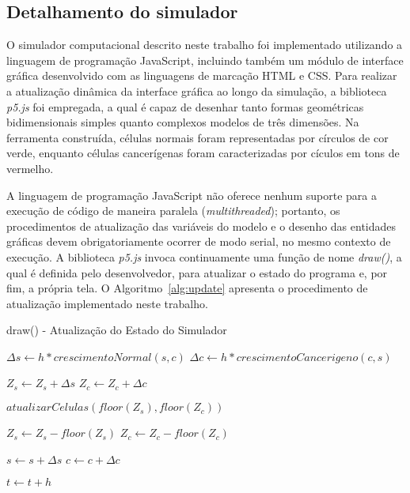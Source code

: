 \documentclass[12pt]{article}
\begin{document}
\subsection{Detalhamento do simulador} \label{sec:simulator}

O simulador computacional descrito neste trabalho foi implementado utilizando a linguagem de programação JavaScript, incluindo também um módulo de interface gráfica desenvolvido com as linguagens de marcação HTML e CSS. Para realizar a atualização dinâmica da interface gráfica ao longo da simulação, a biblioteca \emph{p5.js} foi empregada, a qual é capaz de desenhar tanto formas geométricas bidimensionais simples quanto complexos modelos de três dimensões. Na ferramenta construída, células normais foram representadas por círculos de cor verde, enquanto células cancerígenas foram caracterizadas por cículos em tons de vermelho.

A linguagem de programação JavaScript não oferece nenhum suporte para a execução de código de maneira paralela (\textit{multithreaded}); portanto, os procedimentos de atualização das variáveis do modelo e o desenho das entidades gráficas devem obrigatoriamente ocorrer de modo serial, no mesmo contexto de execução. A biblioteca \emph{p5.js} invoca continuamente uma função de nome \emph{draw()}, a qual é definida pelo desenvolvedor, para atualizar o estado do programa e, por fim, a própria tela. O Algoritmo~\ref{alg:update} apresenta o procedimento de atualização implementado neste trabalho.

\begin{algorithm}[h]
  \small
  \DontPrintSemicolon
  \caption{draw() - Atualização do Estado do Simulador}
  \label{alg:update}

  $\Delta s \leftarrow h * crescimentoNormal(s, c)$
  $\Delta c \leftarrow h * crescimentoCancerigeno(c, s)$ 
  \BlankLine

  \BlankLine

  $Z_s \leftarrow Z_s + \Delta s$ \;
  $Z_c \leftarrow Z_c + \Delta c$ \;
  \BlankLine

  $atualizarCelulas(floor(Z_s), floor(Z_c))$\;
  \BlankLine

  $Z_s \leftarrow Z_s - floor(Z_s)$ \;
  $Z_c \leftarrow Z_c - floor(Z_c)$ \;
  \BlankLine

  $s \leftarrow s + \Delta s$ \;
  $c \leftarrow c + \Delta c$ \;
  \BlankLine

  $t \leftarrow t + h$ \;
\end{algorithm}
\end{document}
